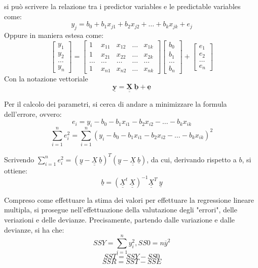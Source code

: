 si può scrivere la relazione tra i predictor variables e le predictable variables come:
\[
y_j = b_0 + b_1 x_{j1} + b_2 x_{j2} + \dots + b_k x_{jk} + e_j
\]
Oppure in maniera estesa come:
\[
\begin{bmatrix}
y_1 \\
y_2 \\
\dots\\
y_n
\end{bmatrix}
= 
\begin{bmatrix}
1 & x_{11} & x_{12} & \dots & x_{1k}\\
1 & x_{21} & x_{22} & \dots & x_{2k}\\
\dots & \dots & \dots & \dots & \dots \\
1 & x_{n1} & x_{n2} & \dots & x_{nk}
\end{bmatrix}
\begin{bmatrix}
b_0 \\
b_1 \\
\dots \\
b_n
\end{bmatrix}
+
\begin{bmatrix}
e_1\\
e_2\\
\dots\\
e_n
\end{bmatrix}
\]
Con la notazione vettoriale
\[
\mathbf{\underline{y}} = \underline{\underline{\mathbf{X}}}\ \underline{\mathbf{b}}+\underline{\mathbf{e}}
\]

Per il calcolo dei parametri, si cerca di andare a minimizzare la formula dell'errore, ovvero:
\[
e_i = y_i - b_0 - b_1 x_{i1} - b_2 x_{i2} - \dots - b_k x_{ik} 
\]
\[
\sum_{i=1}^{n}e_i^2 = \sum_{i=1}^{n}(y_i - b_0 - b_1 x_{i1} - b_2 x_{i2} - \dots - b_k x_{ik})^2
\]

Scrivendo \(\sum_{i=1}^{n}e_i^2 = (\underline{y}-\underline{\underline{X}}\ \underline{b})^T(\underline{y}-\underline{\underline{X}} \ \underline{b})\), da cui, derivando rispetto a \(b\), si ottiene:
\[
\underline{b} = (\underline{\underline{X}}^t\ \underline{\underline{X}})^{-1}\underline{\underline{X}}^T\ \underline{y}
\]

Compreso come effettuare la stima dei valori per effettuare la regressione lineare multipla, si prosegue nell'effettuazione della valutazione degli "errori", delle veriazioni e delle devianze.
Precisamente, partendo dalle variazione e dalle devianze, si ha che:
\[
SSY = \sum_{i=1}^{n}y_i^2, SS0= n\overline{y}^2
\]
\[
SST = SSY - SS0
\]
\[
SSR = SST - SSE
\]

